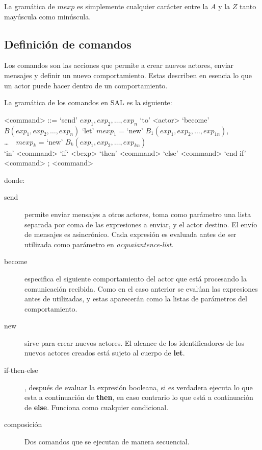 La gramática de $mexp$ es simplemente cualquier carácter entre la $A$ y la $Z$ tanto mayúscula como minúscula. 

\subsection{Definición de comandos}\label{actores:cmd}

Los comandos son las acciones que permite a \SAL crear nuevos actores, enviar mensajes y definir un nuevo comportamiento. Estas describen en esencia lo que un actor puede hacer dentro de un comportamiento.

La gramática de los comandos en SAL es la siguiente:

\begin{grammar}
  <command> ::= `send' $exp_1, exp_2, \ldots, exp_n$ `to' <actor>  
  \alt `become' $B(exp_1, exp_2, \ldots, exp_n)$
  \alt `let' $mexp_1$ = `new' $B_1(exp_1, exp_2, \ldots, exp_{1n})$, \\
   \ldots\ \ $mexp_k$ = `new' $B_k(exp_1, exp_2, \ldots, exp_{kn})$   \\
  `in' <command> 
  \alt `if` <bexp> `then' <command> `else' <command> `end if'
  \alt <command> ; <command>
\end{grammar}

donde:

\begin{description}
\item [send] permite enviar mensajes a otros actores, toma como parámetro una lista separada por coma de las expresiones a enviar, y el actor destino. El envío de mensajes es asincrónico. Cada expresión es evaluada antes de ser utilizada como parámetro en \textit{acquaiantence-list}.
\item [become] especifica el siguiente comportamiento del actor que está procesando la comunicación recibida. Como en el caso anterior se evalúan las expresiones antes de utilizadas, y estas aparecerán como la listas de parámetros del comportamiento. 
\item [new] sirve para crear nuevos actores. El alcance de los
  identificadores de los nuevos actores creados está sujeto al cuerpo de \textbf{let}.
\item [if-then-else], después de evaluar la expresión booleana, si es verdadera
  ejecuta lo que esta a continuación de \textbf{then}, en caso contrario lo que está a
  continuación de \textbf{else}. Funciona como cualquier condicional.
\item [composición] Dos comandos que se ejecutan de manera secuencial.

\end{description}

